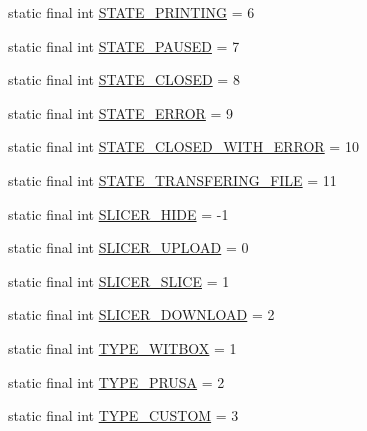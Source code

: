 \begin{DoxyCompactItemize}
static final int \hyperlink{classandroid_1_1app_1_1printerapp_1_1octoprint_1_1_state_utils_a71923659ef561f7becb46e6ac1636bea}{S\+T\+A\+T\+E\+\_\+\+P\+R\+I\+N\+T\+I\+NG} = 6
\item 
static final int \hyperlink{classandroid_1_1app_1_1printerapp_1_1octoprint_1_1_state_utils_a56b09c4647add7d8de4090edde0a74d6}{S\+T\+A\+T\+E\+\_\+\+P\+A\+U\+S\+ED} = 7
\item 
static final int \hyperlink{classandroid_1_1app_1_1printerapp_1_1octoprint_1_1_state_utils_a7d3fc07ed311cbd5b186473639b05cdb}{S\+T\+A\+T\+E\+\_\+\+C\+L\+O\+S\+ED} = 8
\item 
static final int \hyperlink{classandroid_1_1app_1_1printerapp_1_1octoprint_1_1_state_utils_a355919923fde07413dece963c5ec5671}{S\+T\+A\+T\+E\+\_\+\+E\+R\+R\+OR} = 9
\item 
static final int \hyperlink{classandroid_1_1app_1_1printerapp_1_1octoprint_1_1_state_utils_ac7bf437efbc7a4f628669b3ca28de057}{S\+T\+A\+T\+E\+\_\+\+C\+L\+O\+S\+E\+D\+\_\+\+W\+I\+T\+H\+\_\+\+E\+R\+R\+OR} = 10
\item 
static final int \hyperlink{classandroid_1_1app_1_1printerapp_1_1octoprint_1_1_state_utils_a27525b90068ffd361dce0511f74220ab}{S\+T\+A\+T\+E\+\_\+\+T\+R\+A\+N\+S\+F\+E\+R\+I\+N\+G\+\_\+\+F\+I\+LE} = 11
\item 
static final int \hyperlink{classandroid_1_1app_1_1printerapp_1_1octoprint_1_1_state_utils_ad9e48c83ef17e75d68214acf124e9947}{S\+L\+I\+C\+E\+R\+\_\+\+H\+I\+DE} = -\/1
\item 
static final int \hyperlink{classandroid_1_1app_1_1printerapp_1_1octoprint_1_1_state_utils_adcc721669a2d80fedb741fb200e513f2}{S\+L\+I\+C\+E\+R\+\_\+\+U\+P\+L\+O\+AD} = 0
\item 
static final int \hyperlink{classandroid_1_1app_1_1printerapp_1_1octoprint_1_1_state_utils_a8fca60d388313c3ac888782200997659}{S\+L\+I\+C\+E\+R\+\_\+\+S\+L\+I\+CE} = 1
\item 
static final int \hyperlink{classandroid_1_1app_1_1printerapp_1_1octoprint_1_1_state_utils_acbba919e917e97ba6d01ec8857dfeb2a}{S\+L\+I\+C\+E\+R\+\_\+\+D\+O\+W\+N\+L\+O\+AD} = 2
\item 
static final int \hyperlink{classandroid_1_1app_1_1printerapp_1_1octoprint_1_1_state_utils_a3dae28b569e7ae94fb9a60066d5afa10}{T\+Y\+P\+E\+\_\+\+W\+I\+T\+B\+OX} = 1
\item 
static final int \hyperlink{classandroid_1_1app_1_1printerapp_1_1octoprint_1_1_state_utils_a87eb7de192ed884e2e181ca9065ed996}{T\+Y\+P\+E\+\_\+\+P\+R\+U\+SA} = 2
\item 
static final int \hyperlink{classandroid_1_1app_1_1printerapp_1_1octoprint_1_1_state_utils_a7d4e730546415917f35aca8f42a0ab01}{T\+Y\+P\+E\+\_\+\+C\+U\+S\+T\+OM} = 3
\end{DoxyCompactItemize}


